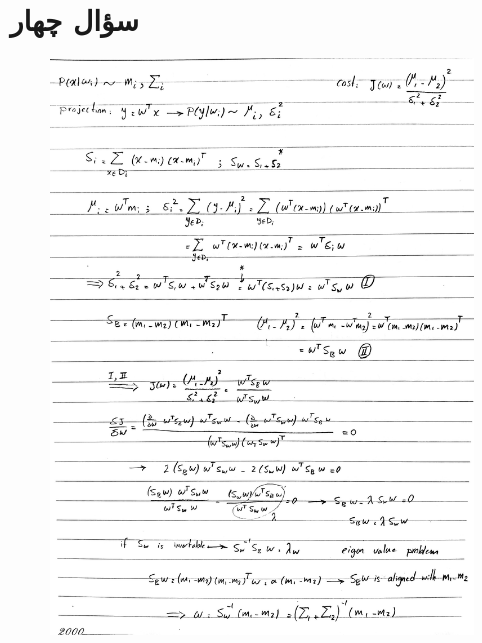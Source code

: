 \documentclass[12pt,onecolumn,a4paper]{article}
\begin{document}
\section*{سؤال چهار}
\begin{figure}[h!]
    \begin{center}
    \includegraphics[width=\linewidth]{hand_written/4.jpg}
    \end{center}
\end{figure}

\newpage
\end{document}
